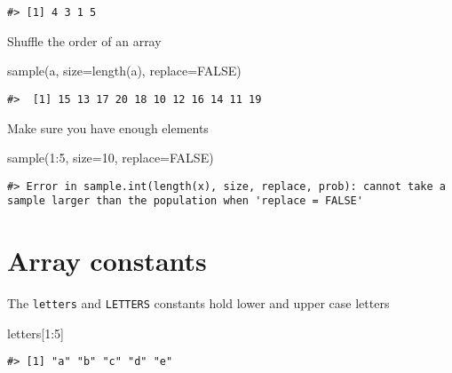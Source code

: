 \documentclass[
]{book}
\newenvironment{Shaded}{\begin{snugshade}}{\end{snugshade}}
\newcommand{\AttributeTok}[1]{\textcolor[rgb]{0.77,0.63,0.00}{#1}}
\newcommand{\ConstantTok}[1]{\textcolor[rgb]{0.00,0.00,0.00}{#1}}
\newcommand{\DecValTok}[1]{\textcolor[rgb]{0.00,0.00,0.81}{#1}}
\newcommand{\FunctionTok}[1]{\textcolor[rgb]{0.00,0.00,0.00}{#1}}
\newcommand{\NormalTok}[1]{#1}
\newcommand{\SpecialCharTok}[1]{\textcolor[rgb]{0.00,0.00,0.00}{#1}}
\begin{document}
\begin{verbatim}
#> [1] 4 3 1 5
\end{verbatim}

Shuffle the order of an array

\begin{Shaded}
\begin{Highlighting}[]
\FunctionTok{sample}\NormalTok{(a, }\AttributeTok{size=}\FunctionTok{length}\NormalTok{(a), }\AttributeTok{replace=}\ConstantTok{FALSE}\NormalTok{)}
\end{Highlighting}
\end{Shaded}

\begin{verbatim}
#>  [1] 15 13 17 20 18 10 12 16 14 11 19
\end{verbatim}

Make sure you have enough elements

\begin{Shaded}
\begin{Highlighting}[]
\FunctionTok{sample}\NormalTok{(}\DecValTok{1}\SpecialCharTok{:}\DecValTok{5}\NormalTok{, }\AttributeTok{size=}\DecValTok{10}\NormalTok{, }\AttributeTok{replace=}\ConstantTok{FALSE}\NormalTok{)}
\end{Highlighting}
\end{Shaded}

\begin{verbatim}
#> Error in sample.int(length(x), size, replace, prob): cannot take a sample larger than the population when 'replace = FALSE'
\end{verbatim}

\hypertarget{array-constants}{%
\section{Array constants}\label{array-constants}}

The \texttt{letters} and \texttt{LETTERS} constants hold lower and upper case letters

\begin{Shaded}
\begin{Highlighting}[]
\NormalTok{letters[}\DecValTok{1}\SpecialCharTok{:}\DecValTok{5}\NormalTok{]}
\end{Highlighting}
\end{Shaded}

\begin{verbatim}
#> [1] "a" "b" "c" "d" "e"
\end{verbatim}
\end{document}
